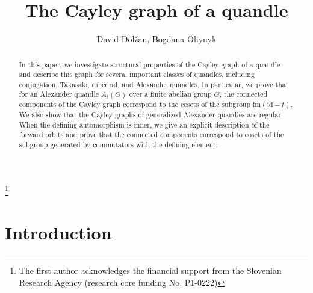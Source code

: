 \documentclass[english,11pt]{amsart}
\begin{document}
\title{The Cayley graph of a quandle}

\author{David Dol\v zan, Bogdana Oliynyk}

\address{D.~Dol\v zan:~Department of Mathematics, Faculty of Mathematics
and Physics, University of Ljubljana, Jadranska 19, SI-1000 Ljubljana, Slovenia, and Institute of Mathematics, Physics and Mechanics, Jadranska 19, SI-1000 Ljubljana, Slovenia; e-mail: 
david.dolzan@fmf.uni-lj.si}
\address{B.~Oliynyk; Faculty of Applied Mathematics, Silesian University of Technology, Kaszubska 23, 44-100, Gliwice, Poland. e-mail: bogdana.oliynyk@polsl.pl}





\thanks{The first author acknowledges the financial support from the Slovenian Research Agency  (research core funding No. P1-0222)}

\begin{abstract}
In this paper, we investigate structural properties of the Cayley graph of a quandle and describe this graph for several important classes of quandles, including conjugation, Takasaki, dihedral, and Alexander quandles. In particular, we prove that for an Alexander quandle $A_t(G)$ over a finite abelian group $G$, the connected components of the Cayley graph correspond to the cosets of the subgroup $\mathrm{im}(\mathrm{id}-t)$. We also show that the Cayley graphs of generalized Alexander quandles are regular. When the defining automorphism is inner, we give an explicit description of the forward orbits and prove that the connected components correspond to cosets of the subgroup generated by commutators with the defining element.
\end{abstract}



\maketitle 


 \section{Introduction}
\end{document}
